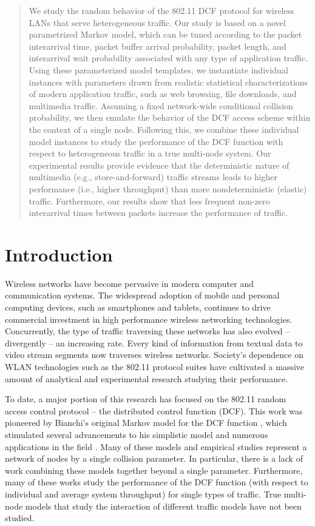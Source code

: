\documentclass[conference]{IEEEtran}
\begin{document}
\begin{abstract}
We study the random behavior of the 802.11 DCF protocol for wireless LANs that serve heterogeneous traffic. Our study is based on a novel parametrized Markov model, which can be tuned according to the packet interarrival time, packet buffer arrival probability, packet length, and interarrival wait probability associated with any type of application traffic. Using these parameterized model templates, we instantiate individual instances with parameters drawn from realistic statistical characterizations of modern application traffic, such as web browsing, file downloads, and multimedia traffic. Assuming a fixed network-wide conditional collision probability, we then emulate the behavior of the DCF access scheme within the context of a single node. Following this, we combine these individual model instances to study the performance of the DCF function with respect to heterogeneous traffic in a true multi-node system. Our experimental results provide evidence that the deterministic nature of multimedia (e.g., store-and-forward) traffic streams leads to higher performance (i.e., higher throughput) than more nondeterministic (elastic) traffic. Furthermore, our results show that less frequent non-zero interarrival times between packets increase the performance of traffic.
\end{abstract}

\section{Introduction}
Wireless networks have become pervasive in modern computer and communication systems. The widespread adoption of mobile and personal computing devices, such as smartphones and tablets, continues to drive commercial investment in high performance wireless networking technologies. Concurrently, the type of traffic traversing these networks has also evolved -- divergently -- an increasing rate. Every kind of information from textual data to video stream segments now traverses wireless networks. Society's dependence on WLAN technologies such as the 802.11 protocol suites have cultivated a massive amount of analytical and experimental research studying their performance. 

To date, a major portion of this research has focused on the 802.11 random access control protocol -- the distributed control function (DCF). This work was pioneered by Bianchi's original Markov model for the DCF function \cite{bianchi1996performance}, which stimulated several advancements to his simplistic model \cite{bianchi1998ieee} and numerous applications in the field \cite{crow1996performance,chhaya1997performance}. Many of these models and empirical studies represent a network of nodes by a single collision parameter. In particular, there is a lack of work combining these models together beyond a single parameter. Furthermore, many of these works study the performance of the DCF function (with respect to individual and average system throughput) for single types of traffic. True multi-node models that study the interaction of different traffic models have not been studied.
\end{document}
